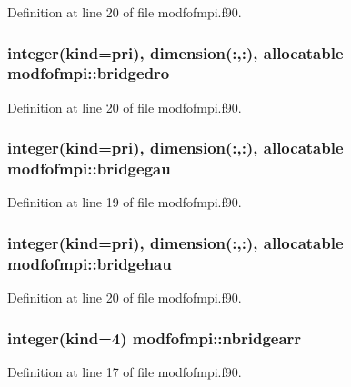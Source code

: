 Definition at line 20 of file modfofmpi.\-f90.

\hypertarget{classmodfofmpi_a400402d1fc58970ecda00536a07c021c}{
\subsubsection[{bridgedro}]{\setlength{\rightskip}{0pt plus 5cm}integer(kind=pri), dimension(\-:,\-:), allocatable modfofmpi\-::bridgedro}}\label{classmodfofmpi_a400402d1fc58970ecda00536a07c021c}


Definition at line 20 of file modfofmpi.\-f90.

\hypertarget{classmodfofmpi_a157af8da53311980e23d05748e181a7f}{
\subsubsection[{bridgegau}]{\setlength{\rightskip}{0pt plus 5cm}integer(kind=pri), dimension(\-:,\-:), allocatable modfofmpi\-::bridgegau}}\label{classmodfofmpi_a157af8da53311980e23d05748e181a7f}


Definition at line 19 of file modfofmpi.\-f90.

\hypertarget{classmodfofmpi_a5a9577c42a1c3c53db8eb603945b530b}{
\subsubsection[{bridgehau}]{\setlength{\rightskip}{0pt plus 5cm}integer(kind=pri), dimension(\-:,\-:), allocatable modfofmpi\-::bridgehau}}\label{classmodfofmpi_a5a9577c42a1c3c53db8eb603945b530b}


Definition at line 20 of file modfofmpi.\-f90.

\hypertarget{classmodfofmpi_a887d577430624ed6c6e8952b089e0576}{
\subsubsection[{nbridgearr}]{\setlength{\rightskip}{0pt plus 5cm}integer(kind=4) modfofmpi\-::nbridgearr}}\label{classmodfofmpi_a887d577430624ed6c6e8952b089e0576}


Definition at line 17 of file modfofmpi.\-f90.


